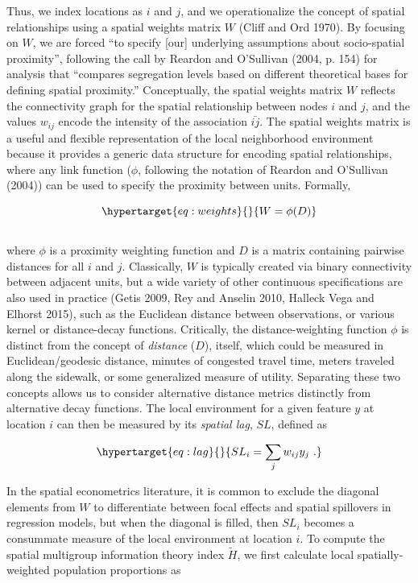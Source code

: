 \documentclass[
  10pt,
]{article}
\begin{document}
Thus, we index locations as \(i\) and \(j\), and we operationalize the
concept of spatial relationships using a spatial weights matrix \(W\)
(Cliff and Ord 1970). By focusing on \(W\), we are forced ``to specify
{[}our{]} underlying assumptions about socio-spatial proximity'',
following the call by Reardon and O'Sullivan (2004, p. 154) for analysis
that ``compares segregation levels based on different theoretical bases
for defining spatial proximity.'' Conceptually, the spatial weights
matrix \(W\) reflects the connectivity graph for the spatial
relationship between nodes \(i\) and \(j\), and the values \(w_{ij}\)
encode the intensity of the association \(\bar{ij}\). The spatial
weights matrix is a useful and flexible representation of the local
neighborhood environment because it provides a generic data structure
for encoding spatial relationships, where any link function (\(\phi\),
following the notation of Reardon and O'Sullivan (2004)) can be used to
specify the proximity between units. Formally,

\begin{equation}\protect\hypertarget{eq:weights}{}{
W = \phi(D)
}\label{eq:weights}\end{equation}\\
where \(\phi\) is a proximity weighting function and \(D\) is a matrix
containing pairwise distances for all \(i\) and \(j\). Classically,
\(W\) is typically created via binary connectivity between adjacent
units, but a wide variety of other continuous specifications are also
used in practice (Getis 2009, Rey and Anselin 2010, Halleck Vega and
Elhorst 2015), such as the Euclidean distance between observations, or
various kernel or distance-decay functions. Critically, the
distance-weighting function \(\phi\) is distinct from the concept of
\emph{distance} (\(D\)), itself, which could be measured in
Euclidean/geodesic distance, minutes of congested travel time, meters
traveled along the sidewalk, or some generalized measure of utility.
Separating these two concepts allows us to consider alternative distance
metrics distinctly from alternative decay functions. The local
environment for a given feature \(y\) at location \(i\) can then be
measured by its \emph{spatial lag}, \(SL\), defined as

\begin{equation}\protect\hypertarget{eq:lag}{}{
SL_i = \sum_j w_{ij} y_j \ .
}\label{eq:lag}\end{equation}

In the spatial econometrics literature, it is common to exclude the
diagonal elements from \(W\) to differentiate between focal effects and
spatial spillovers in regression models, but when the diagonal is
filled, then \(SL_i\) becomes a consummate measure of the local
environment at location \(i\). To compute the spatial multigroup
information theory index \(\tilde{H}\), we first calculate local
spatially-weighted population proportions as
\end{document}
